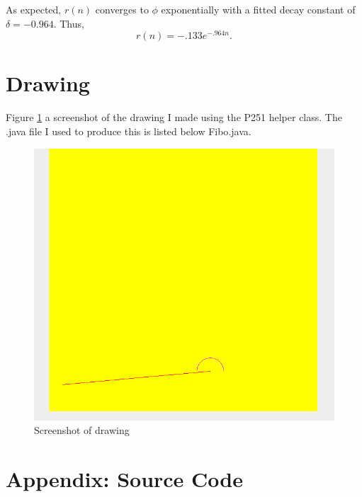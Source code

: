 \documentclass[aps,letterpaper,10pt]{article}
\begin{document}
As expected, $r(n)$ converges to $\phi$ exponentially with a fitted decay constant of $\delta = -0.964$. Thus,$$r(n) = -.133e^{-.964n}.$$
\newpage

\section{Drawing}
Figure \ref{fig: draw} a screenshot of the drawing I made using the P251 helper class. The .java file I used to produce this is listed below Fibo.java.

\begin{figure}[!h]
\centering
\includegraphics[width=.8\textwidth]{Draw/draw.png}
\caption{Screenshot of drawing}
\label{fig: draw}
\end{figure}

\newpage
\section{Appendix: Source Code}

\newpage

\end{document}
